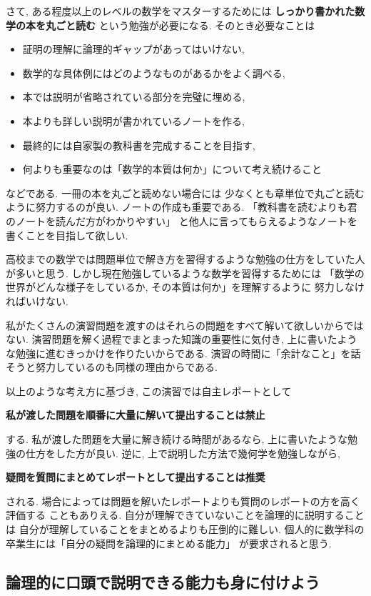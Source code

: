 \documentclass[12pt,twoside]{jarticle}
\begin{document}
さて, ある程度以上のレベルの数学をマスターするためには
{\bf しっかり書かれた数学の本を丸ごと読む}
という勉強が必要になる. そのとき必要なことは
\begin{itemize}
 \item 証明の理解に論理的ギャップがあってはいけない,
 \item 数学的な具体例にはどのようなものがあるかをよく調べる,
 \item 本では説明が省略されている部分を完璧に埋める,
 \item 本よりも詳しい説明が書かれているノートを作る,
 \item 最終的には自家製の教科書を完成することを目指す,
 \item 何よりも重要なのは「数学的本質は何か」について考え続けること
\end{itemize}
などである. 
一冊の本を丸ごと読めない場合には
少なくとも章単位で丸ごと読むように努力するのが良い.
ノートの作成も重要である.
「教科書を読むよりも君のノートを読んだ方がわかりやすい」
と他人に言ってもらえるようなノートを書くことを目指して欲しい.

高校までの数学では問題単位で解き方を習得するような勉強の仕方をしていた人
が多いと思う. しかし現在勉強しているような数学を習得するためには
「数学の世界がどんな様子をしているか, その本質は何か」を理解するように
努力しなければいけない. 

私がたくさんの演習問題を渡すのはそれらの問題をすべて解いて欲しいからでは
ない. 演習問題を解く過程でまとまった知識の重要性に気付き, 
上に書いたような勉強に進むきっかけを作りたいからである.
演習の時間に「余計なこと」を話そうと努力しているのも同様の理由からである.

以上のような考え方に基づき, 
この演習では自主レポートとして
\begin{center}
 \large\bf 私が渡した問題を順番に大量に解いて提出することは禁止
\end{center}
する. 私が渡した問題を大量に解き続ける時間があるなら, 
上に書いたような勉強の仕方をした方が良い.
逆に, 上で説明した方法で幾何学を勉強しながら, 
\begin{center}
 \large\bf 疑問を質問にまとめてレポートとして提出することは推奨
\end{center}
される.
場合によっては問題を解いたレポートよりも質問のレポートの方を高く評価する
こともありえる.  自分が理解できていないことを論理的に説明することは
自分が理解していることをまとめるよりも圧倒的に難しい.
個人的に数学科の卒業生には「自分の疑問を論理的にまとめる能力」
が要求されると思う.

\subsection{論理的に口頭で説明できる能力も身に付けよう}
\end{document}
